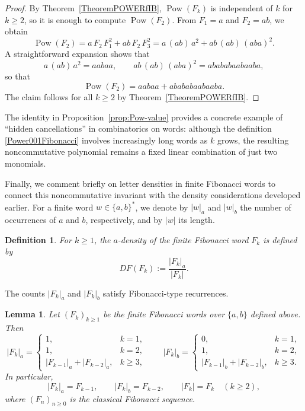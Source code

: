 \documentclass[12pt, a4paper]{article}
\newtheorem{lemma}[theorem]{Lemma}
\newtheorem{definition}{Definition}
\begin{document}
\begin{proof}
By Theorem~\ref{TheoremPOWERfIB}, $\operatorname{Pow}(F_k)$ is independent of $k$ for $k \ge 2$, so it is enough to compute $\operatorname{Pow}(F_2)$. From $F_1 = a$ and $F_2 = ab$, we obtain
\[
\operatorname{Pow}(F_2) 
= a\, F_2\, F_1^2 + ab\, F_2\, F_3^2
= a\,(ab)\,a^2 + ab\,(ab)\,(aba)^2.
\]
A straightforward expansion shows that
\[
a\,(ab)\,a^2 = aabaa,
\qquad
ab\,(ab)\,(aba)^2 = abababaabaaba,
\]
so that
\[
\operatorname{Pow}(F_2) = aabaa + abababaabaaba.
\]
The claim follows for all $k \ge 2$ by Theorem~\ref{TheoremPOWERfIB}.
\end{proof}

The identity in Proposition~\ref{prop:Pow-value} provides a concrete example of ``hidden cancellations'' in combinatorics on words: although the definition \eqref{Power001Fibonacci} involves increasingly long words as $k$ grows, the resulting noncommutative polynomial remains a fixed linear combination of just two monomials.

\medskip

Finally, we comment briefly on letter densities in finite Fibonacci words to connect this noncommutative invariant with the density considerations developed earlier. For a finite word $w \in \{a,b\}^*$, we denote by $|w|_a$ and $|w|_b$ the number of occurrences of $a$ and $b$, respectively, and by $|w|$ its length.

\begin{definition}
For $k \ge 1$, the $a$-density of the finite Fibonacci word $F_k$ is defined by
\[
DF(F_k) := \frac{|F_k|_a}{|F_k|}.
\]
\end{definition}

The counts $|F_k|_a$ and $|F_k|_b$ satisfy Fibonacci-type recurrences.

\begin{lemma}\label{lem:densityFib}
Let $(F_k)_{k \ge 1}$ be the finite Fibonacci words over $\{a,b\}$ defined above. Then
\[
|F_k|_a =
\begin{cases}
1, & k=1,\\
1, & k=2,\\
|F_{k-1}|_a + |F_{k-2}|_a, & k \ge 3,
\end{cases}
\qquad
|F_k|_b =
\begin{cases}
0, & k=1,\\
1, & k=2,\\
|F_{k-1}|_b + |F_{k-2}|_b, & k \ge 3.
\end{cases}
\]
In particular,
\[
|F_k|_a = F_{k-1},\qquad |F_k|_b = F_{k-2},\qquad |F_k| = F_k \quad (k \ge 2),
\]
where $(F_n)_{n\ge 0}$ is the classical Fibonacci sequence.
\end{lemma}
\end{document}
